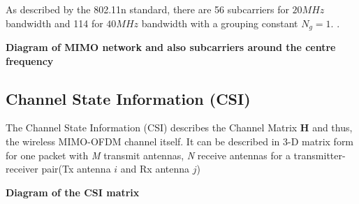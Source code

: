 As described by the 802.11n standard, there are 56 subcarriers for $20MHz$ bandwidth and 114 for $40MHz$ bandwidth with a grouping constant $N_g = 1$.  \citep{full802.11nStandard}.

\textbf{Diagram of MIMO network and also subcarriers around the centre frequency}

\subsection{Channel State Information (CSI)}
The Channel State Information (CSI) describes the Channel Matrix \textbf{H} and thus, the wireless MIMO-OFDM channel itself. It can be described in 3-D matrix form for one packet with \textit{M} transmit antennas, \textit{N} receive antennas for a transmitter-receiver pair(Tx antenna $i$ and Rx antenna $j$)

\textbf{Diagram of the CSI matrix}

